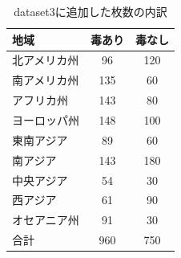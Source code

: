 \documentclass[a4paper, 11pt, titlepage]{jsarticle}
\begin{document}
\clearpage

\begin{table}[htb]
\centering
  \caption{dataset3に追加した枚数の内訳}
  \begin{tabular}{|l|c|c|}  \hline
    地域 & 毒あり & 毒なし \\ \hline \hline
    北アメリカ州 & 96 & 120 \\ \hline
    南アメリカ州 & 135 & 60 \\ \hline
    アフリカ州 & 143 & 80 \\ \hline
    ヨーロッパ州 & 148 & 100 \\ \hline
    東南アジア & 89 & 60 \\ \hline
    南アジア & 143 & 180 \\ \hline
    中央アジア & 54 & 30 \\ \hline
    西アジア & 61 & 90 \\ \hline
    オセアニア州 & 91 & 30 \\ \hline \hline
    合計 & 960 & 750 \\ \hline
  \end{tabular}
\end{table}
\end{document}
